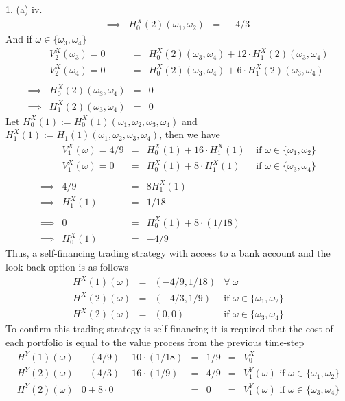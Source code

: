 \documentclass[11pt,a4paper]{article}
\begin{document}
\begin{answer}{1. (a) iv.}
\[\begin{array}{rrcl}
    \implies&H_0^X(2)(\omega_1,\omega_2)&=&-4/3
  \end{array}\]
  And if $\omega\in\{\omega_3,\omega_4\}$
  \[\begin{array}{rrcl}
    &V_2^X(\omega_3)=0&=&H_0^X(2)(\omega_3,\omega_4)+12\cdot H_1^X(2)(\omega_3,\omega_4)\\
    &V_2^X(\omega_4)=0&=&H_0^X(2)(\omega_3,\omega_4)+6\cdot H_1^X(2)(\omega_3,\omega_4)\\\\
    \implies&H_0^X(2)(\omega_3,\omega_4)&=&0\\
    \implies&H_1^X(2)(\omega_3,\omega_4)&=&0
  \end{array}\]
  Let $H_0^X(1):=H_0^X(1)(\omega_1,\omega_2,\omega_3,\omega_4)$ and $H_1^X(1):=H_1(1)(\omega_1,\omega_2,\omega_3,\omega_4)$, then we have
  \[\begin{array}{rrcll}
    &V_1^X(\omega)=4/9&=&H_0^X(1)+16\cdot H_1^X(1)&\text{ if }\omega\in\{\omega_1,\omega_2\}\\
    &V_1^X(\omega)=0&=&H_0^X(1)+8\cdot H_1^X(1)&\text{ if }\omega\in\{\omega_3,\omega_4\}\\\\
    \implies&4/9&=&8H_1^X(1)\\
    \implies&H_1^X(1)&=&1/18\\\\
    \implies&0&=&H_0^X(1)+8\cdot(1/18)\\
    \implies&H_0^X(1)&=&-4/9
  \end{array}\]
  Thus, a self-financing trading strategy with access to a bank account and the look-back option is as follows
  \[\begin{array}{rcll}
    H^X(1)(\omega)&=&(-4/9,1/18)&\forall\ \omega\\
    H^X(2)(\omega)&=&(-4/3,1/9)&\text{if }\omega\in\{\omega_1,\omega_2\}\\
    H^X(2)(\omega)&=&(0,0)&\text{if }\omega\in\{\omega_3,\omega_4\}
  \end{array}\]
  To confirm this trading strategy is self-financing it is required that the cost of each portfolio is equal to the value process from the previous time-step
  \[\begin{array}{r|rclcl}
    H^Y(1)(\omega)&-(4/9)+10\cdot(1/18)&=&1/9&=&V_0^X\\
    H^Y(2)(\omega)&-(4/3)+16\cdot(1/9)&=&4/9&=&V_1^Y(\omega)\text{ if }\omega\in\{\omega_1,\omega_2\}\\
    H^Y(2)(\omega)&0+8\cdot0&=&0&=&V_1^Y(\omega)\text{ if }\omega\in\{\omega_3,\omega_4\}\\

\end{array}\]
\end{answer}
\end{document}

